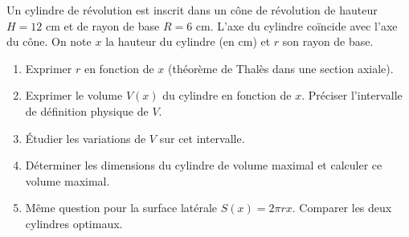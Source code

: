 \documentclass[11pt]{article}
\begin{document}
\begin{exercice}
Un cylindre de révolution est inscrit dans un cône de révolution de hauteur $H = 12$ cm et de rayon de base $R = 6$ cm. L'axe du cylindre coïncide avec l'axe du cône. On note $x$ la hauteur du cylindre (en cm) et $r$ son rayon de base.
\begin{enumerate}
    \item Exprimer $r$ en fonction de $x$ (théorème de Thalès dans une section axiale).
    \item Exprimer le volume $V(x)$ du cylindre en fonction de $x$. Préciser l'intervalle de définition physique de $V$.
    \item Étudier les variations de $V$ sur cet intervalle.
    \item Déterminer les dimensions du cylindre de volume maximal et calculer ce volume maximal.
    \item Même question pour la surface latérale $S(x) = 2\pi r x$. Comparer les deux cylindres optimaux.
\end{enumerate}
\end{exercice}
\end{document}
